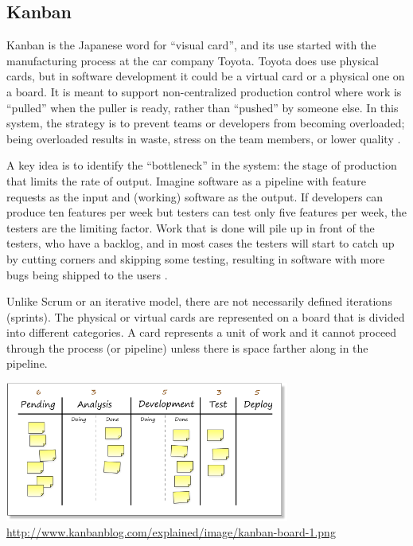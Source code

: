 \subsection*{Kanban}
Kanban is the Japanese word for ``visual card'', and its use started with the manufacturing process at the car company Toyota. Toyota does use physical cards, but in software development it could be a virtual card or a physical one on a board. It is meant to support non-centralized production control where work is ``pulled'' when the puller is ready, rather than ``pushed'' by someone else. In this system, the strategy is to prevent teams or developers from becoming overloaded; being overloaded results in waste, stress on the team members, or lower quality \cite{netobj}.

A key idea is to identify the ``bottleneck'' in the system: the stage of production that limits the rate of output. Imagine software as a pipeline with feature requests as the input and (working) software as the output. If developers can produce ten features per week but testers can test only five features per week, the testers are the limiting factor. Work that is done will pile up in front of the testers, who have a backlog, and in most cases the testers will start to catch up by cutting corners and skipping some testing, resulting in software with more bugs being shipped to the users \cite{kbb}.

Unlike Scrum or an iterative model, there are not necessarily defined iterations (sprints). The physical or virtual cards are represented on a board that is divided into different categories. A card represents a unit of work and it cannot proceed through the process (or pipeline) unless there is space farther along in the pipeline. 

\begin{center}
\includegraphics[width=0.7\textwidth]{images/kanban-board-1.png}
\hfill \url{http://www.kanbanblog.com/explained/image/kanban-board-1.png}
\end{center}

